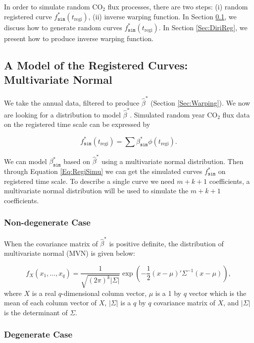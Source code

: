 \documentclass{article}
\begin{document}
In order to simulate random CO$_2$ flux processes, there are two steps: (i) random registered curve $f^{*}_{\texttt{sim}}(t_{\textrm{regi}})$, (ii) inverse warping function. In Section \ref{Sec:MultiNormal}, we discuss how to generate random curves $f^{*}_{\texttt{sim}}(t_{\textrm{regi}})$. In Section \ref{Sec:DiriReg}, we present how to produce inverse warping function.

\subsection{A Model of the Registered Curves: Multivariate Normal}\label{Sec:MultiNormal}

We take the annual data, filtered to produce $\widehat{\beta}^{*}$ (Section \ref{Sec:Warping}). We now are looking for a distribution to model $\widehat{\beta}^{*}$. Simulated random year CO$_2$ flux data on the registered time scale can be expressed by


\begin{equation}
f^{*}_{\texttt{sim}}(t_{\textrm{regi}}) = \sum\beta^{*}_{\texttt{sim}}\phi(t_{\textrm{regi}}).\label{Eq:RegiSimu}
\end{equation}

We can model $\beta^{*}_{\texttt{sim}}$ based on $\widehat{\beta}^{*}$ using a multivariate normal distribution. Then through Equation \ref{Eq:RegiSimu} we can get the simulated curves $f^{*}_{\texttt{sim}}$ on registered time scale. 
To describe a single curve we need $m+k+1$ coefficients, a multivariate normal distribution will be used to simulate the $m+k+1$ coefficients. 

\subsubsection{Non-degenerate Case}

When the covariance matrix of $\widehat{\beta}^{*}$ is positive definite,  the distribution of multivariate normal (MVN) is given below:

\begin{equation}
f_X(x_1,\dots,x_{q}) = \frac{1}{\sqrt{(2\pi)^k|\Sigma|}}\exp\left(-\frac{1}{2}(x-\mu)'\Sigma^{-1}(x-\mu)\right),
\end{equation}
where $X$ is a real $q$-dimensional column vector, $\mu$ is a 1 by $q$ vector which is the mean of each column vector of $X$, $|\Sigma|$ is a $q$ by $q$ covariance matrix of $X$,  and $|\Sigma|$ is the determinant of $\Sigma$. 

\subsubsection{Degenerate Case}
\end{document}
